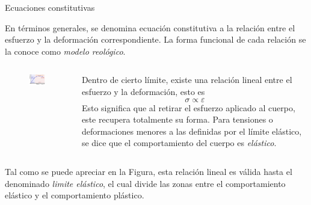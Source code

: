 \documentclass[11pt,handout,aspectratio=1610]{beamer}
\newcommand{\vs}{\vspace{11pt}}
\begin{document}
\begin{frame}{Ecuaciones constitutivas}

    En términos generales, se denomina ecuación constitutiva a la relación entre el esfuerzo y la deformación correspondiente. La forma funcional de cada relación se la conoce como \emph{modelo reológico}.

    \vs 

    \begin{columns}
        \begin{column}{0.4\textwidth}
            \begin{figure}
                \centering
                \includegraphics[width=\textwidth]{../figs/mechanics_stress-10.pdf}
            \end{figure}            
        \end{column}
        \begin{column}{0.6\textwidth}
            Dentro de cierto límite, existe una relación lineal entre el esfuerzo y la deformación, esto es $$ \sigma \propto \varepsilon $$ Esto significa que al retirar el esfuerzo aplicado al cuerpo, este recupera totalmente su forma. Para tensiones o deformaciones menores a las definidas por el límite elástico, se dice que el comportamiento del cuerpo es \emph{elástico}.
        \end{column}
    \end{columns}

    \vs

    Tal como se puede apreciar en la Figura, esta relación lineal es válida hasta el denominado \emph{limite elástico}, el cual divide las zonas entre el comportamiento elástico y el comportamiento plástico.

\end{frame}
\end{document}
